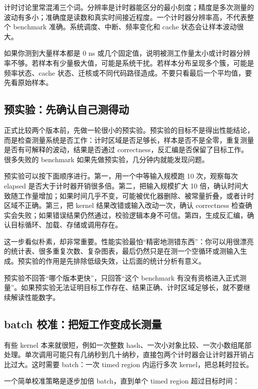 计时讨论里常混淆三个词。分辨率是计时器能区分的最小刻度；精度是多次测量的波动有多小；准确度是读数和真实时间接近程度。一个计时器分辨率高，不代表整个 benchmark 准确。系统调度、中断、频率变化和 cache 状态会让样本波动很大。

如果你测到大量样本都是 0 ns 或几个固定值，说明被测工作量太小或计时器分辨率不够。若样本有少量极大值，可能是系统干扰。若样本分布呈现多个簇，可能是频率状态、cache 状态、迁核或不同代码路径造成。不要只看最后一个平均值，要先看原始样本。

\subsection{预实验：先确认自己测得动}

正式比较两个版本前，先做一轮很小的预实验。预实验的目标不是得出性能结论，而是检查测量系统是否工作：计时区域是否足够长，样本是否不是全零，重复测量是否有可解释的波动，结果是否通过 correctness，反汇编是否保留了目标工作。很多失败的 benchmark 如果先做预实验，几分钟内就能发现问题。

预实验可以按下面顺序进行。第一，用一个中等输入规模跑 10 次，观察每次 elapsed 是否大于计时器开销很多倍。第二，把输入规模扩大 10 倍，确认时间大致随工作量增加；如果时间几乎不变，可能被优化器删除、被常量折叠，或者计时区域不正确。第三，把 kernel 结果改错或输入改动一次，确认 correctness 检查确实会失败；如果错误结果仍然通过，校验逻辑本身不可信。第四，生成反汇编，确认目标循环、加载、存储或调用存在。

这一步看似朴素，却非常重要。性能实验最怕“精密地测错东西”：你可以用很漂亮的统计表、很多重复次数、复杂图表，最后仍然只是在测一个空循环或测输入生成。预实验的作用是先排除低级失效，让后面的统计分析有意义。

\begin{keyidea}
预实验不回答“哪个版本更快”，只回答“这个 benchmark 有没有资格进入正式测量”。如果预实验无法证明目标工作存在、结果正确、计时区域足够长，就不要继续解读性能数字。
\end{keyidea}

\subsection{batch 校准：把短工作变成长测量}

有些 kernel 本来就很短，例如一次整数 hash、一次小对象比较、一次小数组尾部处理。单次调用可能只有几纳秒到几十纳秒，直接包两个计时器会让计时器开销占比过大。这时需要 batch：一次 timed region 内运行多次 kernel，把总耗时拉长。

一个简单校准策略是逐步加倍 batch，直到单个 timed region 超过目标时间：

